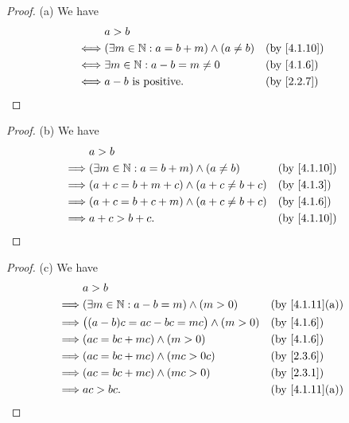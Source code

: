 \begin{proof}{(a)}
  We have
  \begin{align*}
         & a > b                                                            \\
    \iff & (\exists m \in \N : a = b + m) \land (a \neq b) &  & \by{4.1.10} \\
    \iff & \exists m \in \N : a - b = m \neq 0             &  & \by{4.1.6}  \\
    \iff & a - b \text{ is positive}.                      &  & \by{2.2.7}
  \end{align*}
\end{proof}

\begin{proof}{(b)}
  We have
  \begin{align*}
             & a > b                                                            \\
    \implies & (\exists m \in \N : a = b + m) \land (a \neq b) &  & \by{4.1.10} \\
    \implies & (a + c = b + m + c) \land (a + c \neq b + c)    &  & \by{4.1.3}  \\
    \implies & (a + c = b + c + m) \land (a + c \neq b + c)    &  & \by{4.1.6}  \\
    \implies & a + c > b + c.                                  &  & \by{4.1.10}
  \end{align*}
\end{proof}

\begin{proof}{(c)}
  We have
  \begin{align*}
             & a > b                                                                             \\
    \implies & (\exists m \in \N : a - b = m) \land (m > 0)    &  & \text{(by \cref{4.1.11}(a))} \\
    \implies & \big((a - b)c = ac - bc = mc\big) \land (m > 0) &  & \by{4.1.6}                   \\
    \implies & (ac = bc + mc) \land (m > 0)                    &  & \by{4.1.6}                   \\
    \implies & (ac = bc + mc) \land (mc > 0c)                  &  & \by{2.3.6}                   \\
    \implies & (ac = bc + mc) \land (mc > 0)                   &  & \by{2.3.1}                   \\
    \implies & ac > bc.                                        &  & \text{(by \cref{4.1.11}(a))}
  \end{align*}
\end{proof}

